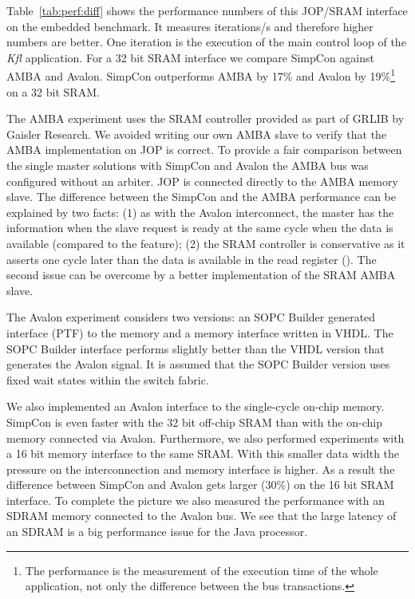Table~\ref{tab:perf:diff} shows the performance numbers of this
JOP/SRAM interface on the embedded benchmark. It measures
iterations/s and therefore higher numbers are better. One iteration
is the execution of the main control loop of the \emph{Kfl}
application. For a 32 bit SRAM interface we compare SimpCon against
AMBA and Avalon. SimpCon outperforms AMBA by 17\% and Avalon by
19\%\footnote{The performance is the measurement of the execution
time of the whole application, not only the difference between the
bus transactions.} on a 32 bit SRAM.

The AMBA experiment uses the SRAM controller provided as part of
GRLIB \cite{grlib} by Gaisler Research. We avoided writing our own
AMBA slave to verify that the AMBA implementation on JOP is correct.
To provide a fair comparison between the single master solutions
with SimpCon and Avalon the AMBA bus was configured without an
arbiter. JOP is connected directly to the AMBA memory slave. The
difference between the SimpCon and the AMBA performance can be
explained by two facts: (1) as with the Avalon interconnect, the
master has the information when the slave request is ready at the
same cycle when the data is available (compared to the
 feature); (2) the SRAM controller is conservative as
it asserts  one cycle later than the data is available
in the read register (). The second issue can be
overcome by a better implementation of the SRAM AMBA slave.


The Avalon experiment considers two versions: an SOPC Builder
generated interface (PTF) to the memory and a memory interface
written in VHDL. The SOPC Builder interface performs slightly better
than the VHDL version that generates the Avalon 
signal. It is assumed that the SOPC Builder version uses fixed wait
states within the switch fabric.

We also implemented an Avalon interface to the single-cycle on-chip
memory. SimpCon is even faster with the 32 bit off-chip SRAM than
with the on-chip memory connected via Avalon. Furthermore, we also
performed experiments with a 16 bit memory interface to the same
SRAM. With this smaller data width the pressure on the
interconnection and memory interface is higher. As a result the
difference between SimpCon and Avalon gets larger (30\%) on the 16
bit SRAM interface. To complete the picture we also measured the
performance with an SDRAM memory connected to the Avalon bus. We see
that the large latency of an SDRAM is a big performance issue for
the Java processor.

